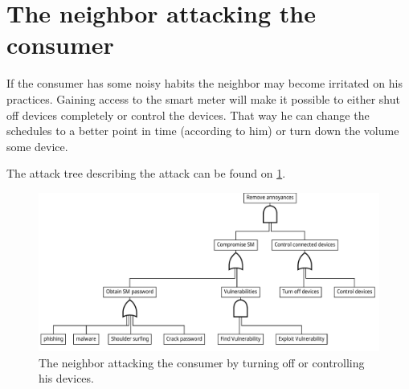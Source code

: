 \section{The neighbor attacking the consumer}

If the consumer has some noisy habits the neighbor may become irritated on his practices.
Gaining access to the smart meter will make it possible to either shut off devices completely or control the devices.
That way he can change the schedules to a better point in time (according to him) or turn down the volume some device.

The attack tree describing the attack can be found on \cref{fig:attack_trees:neighbor}.

\begin{figure}[h]
  \centering
	\includegraphics[width=\textwidth]{figures/graphviz/neighbor_vs_consumer.pdf}
	\caption{The neighbor attacking the consumer by turning off or controlling his devices.}
	\label{fig:attack_trees:neighbor}
\end{figure}